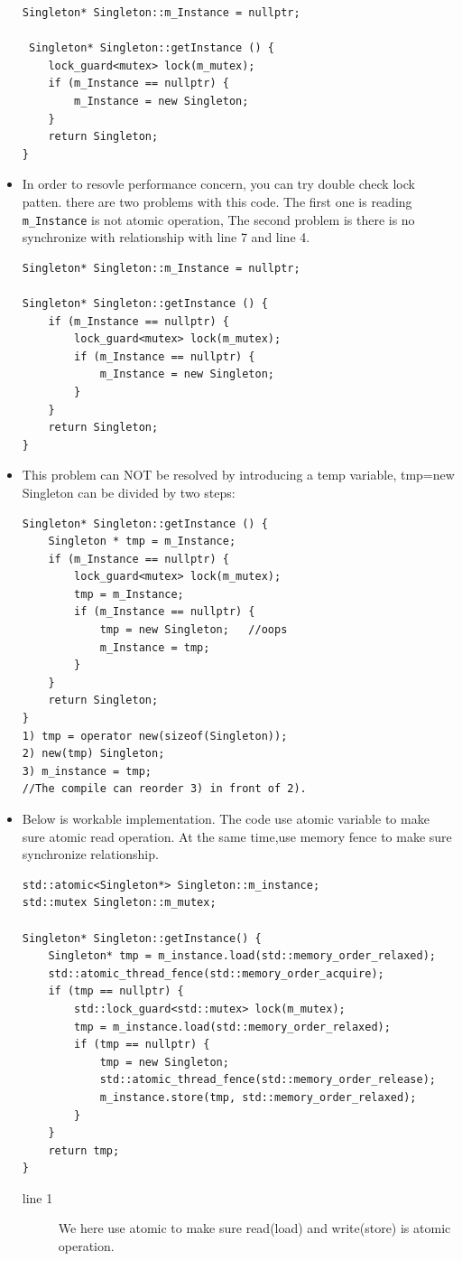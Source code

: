 \documentclass[a4paper,11pt,twoside]{book}
\begin{document}
\begin{itemize}
\begin{lstlisting}[]
Singleton* Singleton::m_Instance = nullptr;

 Singleton* Singleton::getInstance () {
	lock_guard<mutex> lock(m_mutex);
	if (m_Instance == nullptr) {
		m_Instance = new Singleton;
	}
	return Singleton;
}   
\end{lstlisting}

    \item In order to resovle performance concern, you can try double check lock patten. there are two problems with this code. The first one is reading \texttt{m\_Instance} is not atomic operation,  The second problem is there is no synchronize with relationship with line 7 and line 4. 
\begin{lstlisting}[]
Singleton* Singleton::m_Instance = nullptr;

Singleton* Singleton::getInstance () {
	if (m_Instance == nullptr) {
		lock_guard<mutex> lock(m_mutex);
		if (m_Instance == nullptr) {
			m_Instance = new Singleton;
		}
	}
	return Singleton;
}
\end{lstlisting}

    \item This problem can NOT be resolved by introducing a temp variable, tmp=new Singleton can be divided by two steps: 
\begin{lstlisting}[]
Singleton* Singleton::getInstance () {
	Singleton * tmp = m_Instance;
	if (m_Instance == nullptr) {
		lock_guard<mutex> lock(m_mutex);
		tmp = m_Instance;
		if (m_Instance == nullptr) {
			tmp = new Singleton;   //oops
			m_Instance = tmp;  
		}
	}
	return Singleton;
}
1) tmp = operator new(sizeof(Singleton));  
2) new(tmp) Singleton;  
3) m_instance = tmp;  
//The compile can reorder 3) in front of 2). 
\end{lstlisting}


    \item Below is workable implementation. The code use atomic variable to make sure atomic read operation. At the same time,use memory fence to make sure synchronize relationship. 

\begin{lstlisting}[]
std::atomic<Singleton*> Singleton::m_instance;
std::mutex Singleton::m_mutex;

Singleton* Singleton::getInstance() {
    Singleton* tmp = m_instance.load(std::memory_order_relaxed);
    std::atomic_thread_fence(std::memory_order_acquire);
    if (tmp == nullptr) {
        std::lock_guard<std::mutex> lock(m_mutex);
        tmp = m_instance.load(std::memory_order_relaxed);
        if (tmp == nullptr) {
            tmp = new Singleton;
            std::atomic_thread_fence(std::memory_order_release);
            m_instance.store(tmp, std::memory_order_relaxed);
        }
    }
    return tmp;
}
\end{lstlisting}
\begin{description}
    \item[line 1] We here use atomic to make sure read(load) and write(store) is atomic operation.


\end{description}
\end{itemize}
\end{document}
